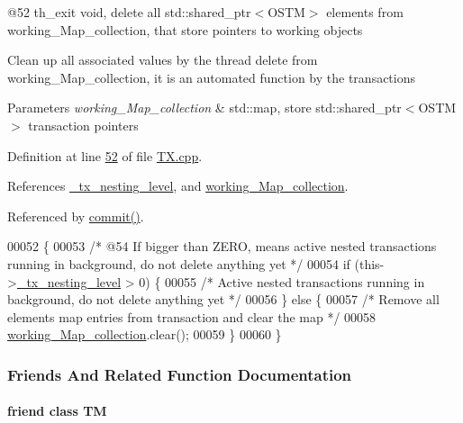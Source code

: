 @52 th\+\_\+exit void, delete all std\+::shared\+\_\+ptr$<$\+O\+S\+T\+M$>$ elements from working\+\_\+\+Map\+\_\+collection, that store pointers to working objects 

Clean up all associated values by the thread delete from working\+\_\+\+Map\+\_\+collection, it is an automated function by the transactions


\begin{DoxyParams}{Parameters}
{\em working\+\_\+\+Map\+\_\+collection} & std\+::map, store std\+::shared\+\_\+ptr$<$\+O\+S\+T\+M$>$ transaction pointers \\
\hline
\end{DoxyParams}


Definition at line \hyperlink{_t_x_8cpp_source_l00052}{52} of file \hyperlink{_t_x_8cpp_source}{T\+X.\+cpp}.



References \hyperlink{_t_x_8h_source_l00101}{\+\_\+tx\+\_\+nesting\+\_\+level}, and \hyperlink{_t_x_8h_source_l00093}{working\+\_\+\+Map\+\_\+collection}.



Referenced by \hyperlink{_t_x_8cpp_source_l00177}{commit()}.


\begin{DoxyCode}
00052                  \{
00053     \textcolor{comment}{/* @54 If bigger than ZERO, means active nested transactions running in background, do not delete
       anything yet */}
00054     \textcolor{keywordflow}{if} (this->\hyperlink{class_t_x_ae8f413fd7f4fea322e7ad3c668f9898e_ae8f413fd7f4fea322e7ad3c668f9898e}{\_tx\_nesting\_level} > 0) \{
00055         \textcolor{comment}{/* Active nested transactions running in background, do not delete anything yet */}
00056     \} \textcolor{keywordflow}{else} \{
00057         \textcolor{comment}{/* Remove all elements map entries from transaction and clear the map */}
00058         \hyperlink{class_t_x_a81aafda16e2f20e36ec6c68e584668ff_a81aafda16e2f20e36ec6c68e584668ff}{working\_Map\_collection}.clear();
00059     \}
00060 \}
\end{DoxyCode}


\subsubsection{Friends And Related Function Documentation}
\paragraph[{\texorpdfstring{TM}{TM}}]{\setlength{\rightskip}{0pt plus 5cm}friend class {\bf TM}\hspace{0.3cm}{\ttfamily [friend]}}\hypertarget{class_t_x_adf1ccda799ef5c419cb43b8ae55eb45c_adf1ccda799ef5c419cb43b8ae55eb45c}{}\label{class_t_x_adf1ccda799ef5c419cb43b8ae55eb45c_adf1ccda799ef5c419cb43b8ae55eb45c}


